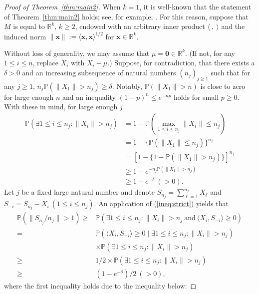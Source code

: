 \documentclass[preprint]{imsart}
\theoremstyle{plain}
\theoremstyle{remark}
\begin{document}
\begin{appendix}
\begin{proof}[Proof of Theorem~\ref{thm:main2}]
When $k=1$, it is well-known that the statement of Theorem~\ref{thm:main2} holds; see, for example, \cite{stoica2010kolmogorov, yuan2015conditional, naderi2019version}. For this reason, suppose that $M$ is equal to $\mathbb{R}^k$, $k\ge 2$, endowed with an arbitrary inner product $\langle~, ~\rangle$ and the induced norm $\|\mathbf{x}\|:=\langle \mathbf{x}, \mathbf{x}\rangle^{1/2}$ for $\mathbf{x}\in \mathbb{R}^k$.

Without loss of generality, we may assume that $\mu=\textbf{0}\in \mathbb{R}^k$. (If not, for any $1\le i\le n$, replace $X_i$ with $X_i - \mu$.) Suppose, for contradiction, that there exists a $\delta > 0$ and an increasing subsequence of natural numbers $(n_{j})_{j\ge 1}$ such that for any $j\ge 1$, $n_j\mathbb{P}(\|X_1\| > n_j) \ge \delta$. Notably, $\mathbb{P}(\|X_1\|>n)$ is close to zero for large enough $n$ and an inequality $(1-p)^n \le e^{-np}$ holds for small $p\ge0$. With these in mind, for large enough $j$
\begin{align}\label{ineq:strict}
\mathbb{P}(\exists 1 \le i\le n_{j}: \|X_i\|> n_{j}) &= 1- \mathbb{P}(\max_{1\le i\le n_{j}} \|X_i\| \le n_{j}) \nonumber \\
&= 1-\{\mathbb{P}(\|X_1\| \le n_{j})\}^{n_{j}} \nonumber \\
&= [1-\{1-\mathbb{P}(\| X_1\|>n_{j})\}]^{n_{j}} \nonumber \\
&\ge 1-e^{-n_{j}\mathbb{P}(\|X_1 \|>n_{j})} \nonumber \\
&\ge 1-e^{-\delta} ~(>0).
\end{align}
Let $j$ be a fixed large natural number and denote $S_{n_{j}}=\sum_{\ell=1}^{n_{j}}X_\ell$ and $S_{-i} = S_{n_{j}} - X_i ~ (1\le i\le n_j)$. An application of (\ref{ineq:strict}) yields that
\begin{align}\label{ineq:strict2}
\mathbb{P}(\|S_{n_j}/n_{j}\|>1) \ge& \mathbb{P}(\exists1\le i\le n_j: \|X_i\|>n_j ~ \mbox{and} ~ \langle X_i, S_{-i} \rangle \ge 0) \nonumber \\
=& \mathbb{P}(\langle X_i, S_{-i}\rangle \ge 0  \mid \exists1\le i\le n_j: \|X_i\|>n_j) \nonumber \\
& \times \mathbb{P}(\exists1\le i\le n_j: \|X_i\|>n_j) \nonumber \\
\ge& 1/2 \times \mathbb{P}(\exists 1\le i\le n_j: \|X_i\|>n_j) \nonumber \\
\ge& (1-e^{-\delta})/2 ~( > 0),
\end{align}
where the first inequality holds due to the inequality below:

\end{proof}
\end{appendix}
\end{document}
